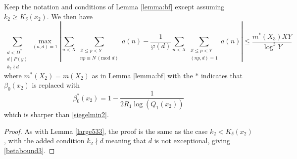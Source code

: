\documentclass[12pt]{amsart}
\begin{document}
\begin{lemma}\label{bflem2}
    Keep the notation and conditions of Lemma \ref{lemma:bf} except assuming $k_2\ge K_{\delta}(x_2)$. We then have
    \begin{equation*}
        \sum_{\substack{d<D^* \\ d\mid P(y)\\k_2\nmid d}} \max_{(a,d)=1}\left| \sum_{n<X}\sum_{\substack{Z\le p <Y\\ np\equiv N\: (\text{mod }d)}}a(n)-\frac{1}{\varphi(d)}\sum_{n<X} \sum_{\substack{Z\le p <Y\\ (np,d)=1}}a(n)\right|\le \frac{m^*(X_3)XY}{\log^3 Y}
    \end{equation*}
    where $m^*(X_2)=m(X_2)$ as in Lemma \ref{lemma:bf} with the $*$ indicates that $\beta_0(x_2)$ is replaced with
    \begin{equation}\label{betabound3}
        \beta_0^*(x_2)= 1-\frac{1}{2R_1\log (Q_1(x_2))}
    \end{equation}
    which is sharper than \eqref{siegelmin2}.
\end{lemma}
\begin{proof}
    As with Lemma \ref{large533}, the proof is the same as the case $k_2<K_{\delta}(x_2)$, with the added condition $k_2\nmid d$ meaning that $d$ is not exceptional, giving \eqref{betabound3}. 
\end{proof}
 
\end{document}
